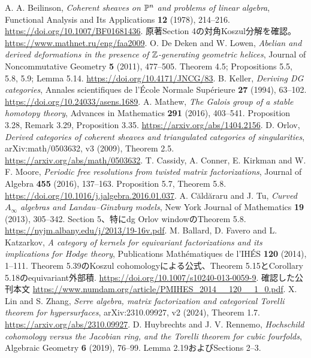 A. A. Beilinson,
\emph{Coherent sheaves on \(\mathbb P^n\) and problems of linear algebra},
Functional Analysis and Its Applications \textbf{12} (1978), 214--216.
\url{https://doi.org/10.1007/BF01681436}.
原著Section 4の対角Koszul分解を確認。
\url{https://www.mathnet.ru/eng/faa2009}.
O. De Deken and W. Lowen,
\emph{Abelian and derived deformations in the presence of \(\mathbb Z\)-generating geometric helices},
Journal of Noncommutative Geometry \textbf{5} (2011), 477--505.
Theorem 4.5; Propositions 5.5, 5.8, 5.9; Lemma 5.14.
\url{https://doi.org/10.4171/JNCG/83}.
B. Keller, \emph{Deriving DG categories},
Annales scientifiques de l'École Normale Supérieure \textbf{27} (1994), 63--102.
\url{https://doi.org/10.24033/asens.1689}.
A. Mathew, \emph{The Galois group of a stable homotopy theory},
Advances in Mathematics \textbf{291} (2016), 403--541.
Proposition 3.28, Remark 3.29, Proposition 3.35.
\url{https://arxiv.org/abs/1404.2156}.
D. Orlov,
\emph{Derived categories of coherent sheaves and triangulated categories of singularities},
arXiv:math/0503632, v3 (2009), Theorem 2.5.
\url{https://arxiv.org/abs/math/0503632}.
T. Cassidy, A. Conner, E. Kirkman and W. F. Moore,
\emph{Periodic free resolutions from twisted matrix factorizations},
Journal of Algebra \textbf{455} (2016), 137--163.
Proposition 5.7, Theorem 5.8.
\url{https://doi.org/10.1016/j.jalgebra.2016.01.037}.
A. Căldăraru and J. Tu, \emph{Curved \(A_\infty\) algebras and Landau--Ginzburg models},
New York Journal of Mathematics \textbf{19} (2013), 305--342.
Section 5、特にdg Orlov windowのTheorem 5.8.
\url{https://nyjm.albany.edu/j/2013/19-16v.pdf}.
M. Ballard, D. Favero and L. Katzarkov,
\emph{A category of kernels for equivariant factorizations and its implications for Hodge theory},
Publications Mathématiques de l'IHÉS \textbf{120} (2014), 1--111.
Theorem 5.39のKoszul cohomologyによる公式、Theorem 5.15とCorollary 5.18のequivariant外部積.
\url{https://doi.org/10.1007/s10240-013-0059-9}.
確認した公刊本文 \url{https://www.numdam.org/article/PMIHES_2014__120__1_0.pdf}.
X. Lin and S. Zhang,
\emph{Serre algebra, matrix factorization and categorical Torelli theorem for hypersurfaces},
arXiv:2310.09927, v2 (2024), Theorem 1.7.
\url{https://arxiv.org/abs/2310.09927}.
D. Huybrechts and J. V. Rennemo,
\emph{Hochschild cohomology versus the Jacobian ring, and the Torelli theorem for cubic fourfolds},
Algebraic Geometry \textbf{6} (2019), 76--99.
Lemma 2.19およびSections 2--3.
